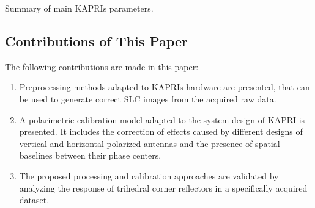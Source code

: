\begin{table*}
	\centering
	\caption{Summary of main KAPRIs parameters.}
	\label{tab:kapri_parameters}
\end{table*}
\subsection{Contributions of This Paper}
The following contributions are made in this paper:
\begin{enumerate}
	\item Preprocessing methods adapted to KAPRIs hardware are presented, that can be used to generate correct SLC images from the acquired raw data.
	\item A polarimetric calibration model adapted to the system design of KAPRI is presented. It includes the correction of effects caused by different designs of vertical and horizontal polarized antennas and the presence of spatial baselines between their phase centers.
	\item The proposed processing and calibration approaches are validated by analyzing the response of trihedral corner reflectors in a specifically acquired dataset.
\end{enumerate}
